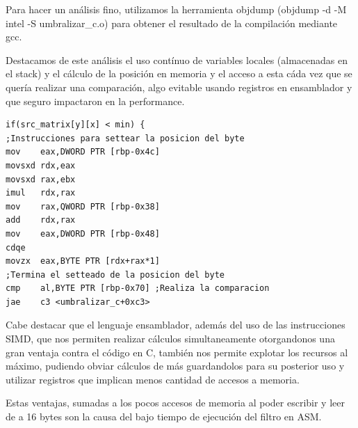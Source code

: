 Para hacer un análisis fino, utilizamos la herramienta objdump (objdump -d -M intel -S umbralizar\_c.o) para obtener el resultado de la compilación mediante gcc.

Destacamos de este análisis el uso contínuo de variables locales (almacenadas en el stack) y el cálculo de la posición en memoria y el acceso a esta cáda vez que se quería realizar una comparación, algo evitable usando registros en ensamblador y que seguro impactaron en la performance.

\begin{verbatim}
if(src_matrix[y][x] < min) {
;Instrucciones para settear la posicion del byte
mov    eax,DWORD PTR [rbp-0x4c]
movsxd rdx,eax
movsxd rax,ebx
imul   rdx,rax
mov    rax,QWORD PTR [rbp-0x38]
add    rdx,rax
mov    eax,DWORD PTR [rbp-0x48]
cdqe   
movzx  eax,BYTE PTR [rdx+rax*1]
;Termina el setteado de la posicion del byte
cmp    al,BYTE PTR [rbp-0x70] ;Realiza la comparacion
jae    c3 <umbralizar_c+0xc3>
\end{verbatim}

Cabe destacar que el lenguaje ensamblador, además del uso de las instrucciones SIMD, que nos permiten realizar cálculos simultaneamente otorgandonos una gran ventaja contra el código en C, también nos permite explotar los recursos al máximo, pudiendo obviar cálculos de más guardandolos para su posterior uso y utilizar registros que implican menos cantidad de accesos a memoria.

Estas ventajas, sumadas a los pocos accesos de memoria al poder escribir y leer de a 16 bytes son la causa del bajo tiempo de ejecución del filtro en ASM.